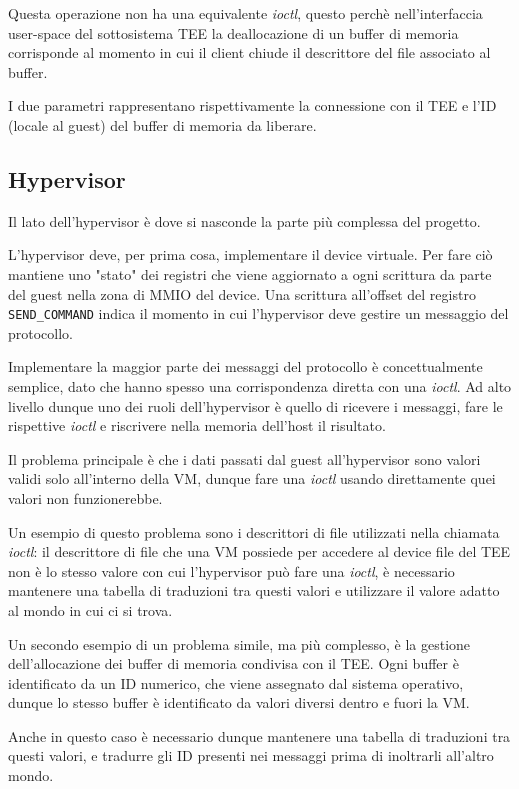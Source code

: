 \documentclass[12pt,italian]{report}
\begin{document}
Questa operazione non ha una equivalente \textit{ioctl}, questo perchè
nell'interfaccia user-space del sottosistema TEE la deallocazione di un
buffer di memoria corrisponde al momento in cui il client chiude il
descrittore del file associato al buffer.

I due parametri rappresentano rispettivamente la connessione con il TEE
e l'ID (locale al guest) del buffer di memoria da liberare.

\subsection{Hypervisor}
\label{subsection:hypervisor}
Il lato dell'hypervisor è dove si nasconde la parte più complessa del progetto.

L'hypervisor deve, per prima cosa, implementare il device virtuale.
Per fare ciò mantiene uno "stato" dei registri che viene aggiornato a ogni
scrittura da parte del guest nella zona di MMIO del device.
Una scrittura all'offset del registro \texttt{SEND\_COMMAND} indica il momento
in cui l'hypervisor deve gestire un messaggio del protocollo.

Implementare la maggior parte dei messaggi del protocollo è concettualmente
semplice, dato che hanno spesso una corrispondenza diretta con una
\textit{ioctl}.
Ad alto livello dunque uno dei ruoli dell'hypervisor è quello di ricevere
i messaggi, fare le rispettive \textit{ioctl} e riscrivere nella memoria
dell'host il risultato.

Il problema principale è che i dati passati dal guest all'hypervisor sono
valori validi solo all'interno della VM, dunque fare una \textit{ioctl}
usando direttamente quei valori non funzionerebbe.

Un esempio di questo problema sono i descrittori di file utilizzati nella
chiamata \textit{ioctl}: 
il descrittore di file che una VM possiede per accedere al device file del TEE
non è lo stesso valore con cui l'hypervisor può fare una \textit{ioctl},
è necessario mantenere una tabella di traduzioni tra questi valori e
utilizzare il valore adatto al mondo in cui ci si trova.

Un secondo esempio di un problema simile, ma più complesso, è la gestione
dell'allocazione dei buffer di memoria condivisa con il TEE.
Ogni buffer è identificato da un ID numerico, che viene assegnato dal sistema
operativo, dunque lo stesso buffer è identificato da valori diversi dentro
e fuori la VM.

Anche in questo caso è necessario dunque mantenere una tabella di traduzioni
tra questi valori, e tradurre gli ID presenti nei messaggi prima di inoltrarli
all'altro mondo.
\end{document}
